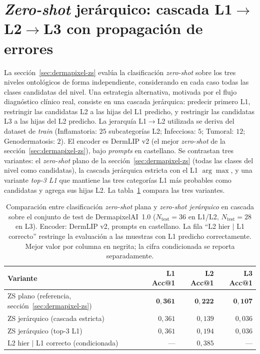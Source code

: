 \section{\emph{Zero-shot} jerárquico: cascada L1$\to$L2$\to$L3
con propagación de errores}
\label{sec:dermapixel-extra-hierzs}

La sección~\ref{sec:dermapixel-zs} evalúa la clasificación
\emph{zero-shot} sobre los tres niveles ontológicos de forma
independiente, considerando en cada caso todas las clases
candidatas del nivel. Una estrategia alternativa, motivada por el
flujo diagnóstico clínico real, consiste en una cascada
jerárquica: predecir primero L1, restringir las candidatas L2 a las
hijas del L1 predicho, y restringir las candidatas L3 a las hijas
del L2 predicho. La jerarquía L1$\to$L2 utilizada se deriva del
dataset de \emph{train} (Inflamatoria: $25$ subcategorías L2;
Infecciosa: $5$; Tumoral: $12$; Genodermatosis: $2$). El encoder
es DermLIP v2 (el mejor \emph{zero-shot} de la
sección~\ref{sec:dermapixel-zs}), bajo \emph{prompts} en
castellano. Se contrastan tres variantes: el \emph{zero-shot}
plano de la sección~\ref{sec:dermapixel-zs} (todas las clases del
nivel como candidatas), la cascada jerárquica estricta con el L1
$\arg\max$, y una variante \emph{top-3 L1} que mantiene las tres
categorías L1 más probables como candidatas y agrega sus hijas L2.
La tabla~\ref{tab:dermapixel-extra-hierzs} compara las tres
variantes.

\begin{table}[H]
\centering
\footnotesize
\setlength{\tabcolsep}{4pt}
\renewcommand{\arraystretch}{0.95}
\caption{Comparación entre clasificación \emph{zero-shot} plana y
\emph{zero-shot jerárquico} en cascada sobre el conjunto de test de
DermapixelAI~1.0 ($N_{\mathrm{test}} = 36$ en L1/L2,
$N_{\mathrm{test}} = 28$ en L3). Encoder: DermLIP v2, prompts en
castellano. La fila ``L2 hier $|$ L1 correcto'' restringe la
evaluación a las muestras con L1 predicho correctamente. Mejor
valor por columna en negrita; la cifra condicionada se reporta
separadamente.}
\label{tab:dermapixel-extra-hierzs}
\begin{tabular}{lrrr}
\hline
Variante                                  & L1 Acc@1 & L2 Acc@1 & L3 Acc@1 \\
\hline
ZS plano (referencia, sección~\ref{sec:dermapixel-zs}) & $\mathbf{0{,}361}$ & $\mathbf{0{,}222}$ & $\mathbf{0{,}107}$ \\
ZS jerárquico (cascada estricta)           & $0{,}361$          & $0{,}139$          & $0{,}036$ \\
ZS jerárquico (top-3 L1)                   & $0{,}361$          & $0{,}194$          & $0{,}036$ \\
\hline
L2 hier $|$ L1 correcto (condicionada)     & ---                & $0{,}385$          & --- \\
\hline
\end{tabular}
\end{table}

